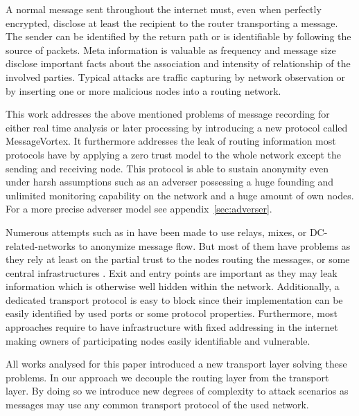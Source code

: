 \documentclass[9pt,journal,compsoc]{IEEEtran}
\begin{document}
A normal message sent throughout the internet must, even when perfectly encrypted, disclose at least the recipient to the router transporting a message. The sender can be identified by the return path or is identifiable by following the source of packets. Meta information is valuable as frequency and message size disclose important facts about the association and intensity of relationship of the involved parties. Typical attacks are traffic capturing by network observation or by inserting one or more malicious nodes into a routing network. 

This work addresses the above mentioned problems of message recording for either real time analysis or later processing by introducing a new  protocol called MessageVortex. It furthermore addresses the leak of routing information most protocols have by applying a zero trust model to the whole network except the sending and receiving node. This protocol is able to sustain anonymity even under harsh assumptions such as an adverser possessing a huge founding and unlimited monitoring capability on the network and a huge amount of own nodes. For a more precise adverser model see appendix~\ref{sec:adverser}.

Numerous attempts such as in \cite{minion-design,babel,mixmaster-spec,tor-design,freehaven-berk,herbivore:tr} have been made to use relays\cite{CHAUM1}, mixes\cite{CHAUM1}, or DC-related-networks\cite{chaum-dc} to anonymize message flow. But most of them have problems as they rely at least on the partial trust to the nodes routing the messages, or some central infrastructures \cite{hs-attack06,esorics13-cellflood,esorics12-torscan,oakland2013-trawling}. Exit and entry points are important as they may leak information which is otherwise well hidden within the network. Additionally, a dedicated transport protocol is easy to block since their implementation can be easily identified by used ports or some protocol properties. Furthermore, most approaches require to have infrastructure with fixed addressing in the internet making owners of participating nodes easily identifiable and vulnerable.

All works analysed for this paper introduced a new transport layer solving these problems. In our approach we decouple the routing layer from the transport layer. By doing so we introduce new degrees of complexity to attack scenarios as messages may use any common transport protocol of the used network. 
\end{document}
